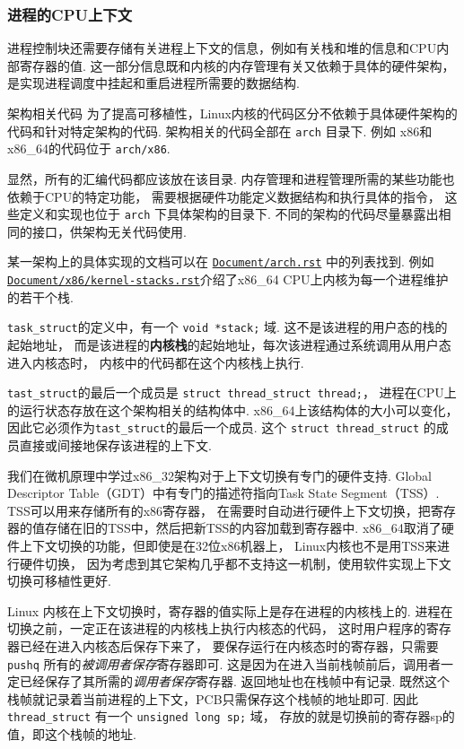 \subsubsection{进程的CPU上下文}
进程控制块还需要存储有关进程上下文的信息，例如有关栈和堆的信息和CPU内部寄存器的值.
这一部分信息既和内核的内存管理有关又依赖于具体的硬件架构，
是实现进程调度中挂起和重启进程所需要的数据结构.
\begin{readsrcbox}{架构相关代码}
	为了提高可移植性，Linux内核的代码区分不依赖于具体硬件架构的代码和针对特定架构的代码.
	架构相关的代码全部在 \lstinline{arch} 目录下.
	例如 x86和x86\_64的代码位于 \lstinline{arch/x86}.

	显然，所有的汇编代码都应该放在该目录.
	内存管理和进程管理所需的某些功能也依赖于CPU的特定功能，
	需要根据硬件功能定义数据结构和执行具体的指令，
	这些定义和实现也位于 \lstinline{arch} 下具体架构的目录下.
	不同的架构的代码尽量暴露出相同的接口，供架构无关代码使用.

	某一架构上的具体实现的文档可以在 \href{https://docs.kernel.org/arch.html}{\lstinline{Document/arch.rst}} 中的列表找到.
	例如\href{https://docs.kernel.org/x86/kernel-stacks.html}{\lstinline{Document/x86/kernel-stacks.rst}}介绍了x86\_64 CPU上内核为每一个进程维护的若干个栈.
\end{readsrcbox}
\lstinline{task_struct}的定义中，有一个 \lstinline{void *stack;} 域.
这不是该进程的用户态的栈的起始地址，
而是该进程的\textbf{内核栈}的起始地址，每次该进程通过系统调用从用户态进入内核态时，
内核中的代码都在这个内核栈上执行.

\lstinline{tast_struct}的最后一个成员是 \lstinline{struct thread_struct thread;}，
进程在CPU上的运行状态存放在这个架构相关的结构体中.
x86\_64上该结构体的大小可以变化，因此它必须作为\lstinline{tast_struct}的最后一个成员.
这个 \lstinline{struct thread_struct} 的成员直接或间接地保存该进程的上下文.

我们在微机原理中学过x86\_32架构对于上下文切换有专门的硬件支持.
Global Descriptor Table（GDT）中有专门的描述符指向Task State Segment（TSS）.
TSS可以用来存储所有的x86寄存器，
在需要时自动进行硬件上下文切换，把寄存器的值存储在旧的TSS中，然后把新TSS的内容加载到寄存器中.
x86\_64取消了硬件上下文切换的功能，但即使是在32位x86机器上，
Linux内核也不是用TSS来进行硬件切换，
因为考虑到其它架构几乎都不支持这一机制，使用软件实现上下文切换可移植性更好.

Linux 内核在上下文切换时，寄存器的值实际上是存在进程的内核栈上的.
进程在切换之前，一定正在该进程的内核栈上执行内核态的代码，
这时用户程序的寄存器已经在进入内核态后保存下来了，
要保存运行在内核态时的寄存器，只需要 \lstinline{pushq} 所有的\textit{被调用者保存}寄存器即可.
这是因为在进入当前栈帧前后，调用者一定已经保存了其所需的\textit{调用者保存}寄存器.
返回地址也在栈帧中有记录.
既然这个栈帧就记录着当前进程的上下文，PCB只需保存这个栈帧的地址即可.
因此 \lstinline{thread_struct} 有一个 \lstinline{unsigned long sp;} 域，
存放的就是切换前的寄存器sp的值，即这个栈帧的地址.

